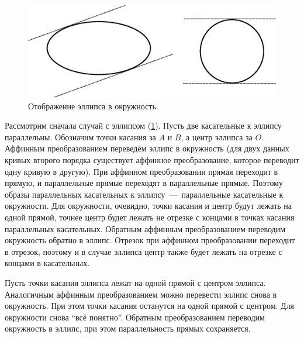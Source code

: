 \documentclass[a4paper,12pt]{article}
\begin{document}
  \begin{solution}
    \begin{figure}
      \centering
      
      \includegraphics[width=0.5\columnwidth]{ellipse-new-ellipse}
      
      \caption{Отображение эллипса в окружность.}
      \label{fig:ellipse-new-ellipse}
    \end{figure}
    
    Рассмотрим сначала случай с эллипсом (\ref{fig:ellipse-new-ellipse}).
    Пусть две касательные к эллипсу параллельны.
    Обозначим точки касания за $A$ и $B$, а центр эллипса за $O$.
    Аффинным преобразованием переведём эллипс в окружность (для двух данных кривых второго порядка существует аффинное преобразование, которое переводит одну кривую в другую).
    При аффинном преобразовании прямая переходит в прямую, и параллельные прямые переходят в параллельные прямые.
    Поэтому образы параллельных касательных к эллипсу~---~параллельные касательные к окружности.
    Для окружности, очевидно, точки касания и центр будут лежать на одной прямой, точнее центр будет лежать не отрезке с концами в точках касания параллельных касательных.
    Обратным аффинным преобразованием переводим окружность обратно в эллипс.
    Отрезок при аффинном преобразовании переходит в отрезок, поэтому и в случае эллипса центр также будет лежать на отрезке с концами в касательных.
    
    Пусть точки касания эллипса лежат на одной прямой с центром эллипса.
    Аналогичным аффинным преобразованием можно перевести эллипс снова в окружность.
    При этом точки касания останутся на одной прямой с центром.
    Для окружности снова ``всё понятно''.
    Обратным преобразованием переводим окружность в эллипс, при этом параллельность прямых сохраняется.
    
    \bigskip



\end{solution}
\end{document}
